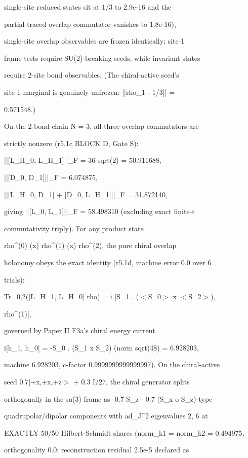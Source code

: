 \documentclass[11pt,a4paper]{article}
\theoremstyle{definition}
\begin{document}
    single-site reduced states sit at 1/3 to 2.9e-16 and the

    partial-traced overlap commutator vanishes to 1.8e-16),

    single-site overlap observables are frozen identically; site-1

    frame tests require SU(2)-breaking seeds, while invariant states

    require 2-site bond observables. (The chiral-active seed's

    site-1 marginal is genuinely unfrozen: ||rho\_1 - 1/3|| =

    0.571548.)


On the 2-bond chain N = 3, all three overlap commutators are

strictly nonzero (r5.1c BLOCK D, Gate S):


    ||[L\_{H\_0}, L\_{H\_1}]||\_F = 36 sqrt(2) = 50.911688,

    ||[D\_0, D\_1]||\_F          = 6.074875,

    ||[L\_{H\_0}, D\_1] + [D\_0, L\_{H\_1}]||\_F = 31.872140,


giving ||[L\_0, L\_1]||\_F = 58.498310 (excluding exact finite-t

commutativity triply). For any product state

rho\^{}{(0)} (x) rho\^{}{(1)} (x) rho\^{}{(2)}, the pure chiral overlap

holonomy obeys the exact identity (r5.1d, machine error 0.0 over 6

trials):


    Tr\_{0,2}([L\_{H\_1}, L\_{H\_0}] rho) = i [S\_1 . ($<$S\_0$>$ x $<$S\_2$>$),

    rho\^{}{(1)}],


governed by Paper II F3a's chiral energy current

i[h\_1, h\_0] = -S\_0 . (S\_1 x S\_2) (norm sqrt(48) = 6.928203,

machine 6.928203, c-factor 0.9999999999999997). On the chiral-active

seed 0.7|+x,+x,+z$>$ + 0.3 I/27, the chiral generator splits

orthogonally in the su(3) frame as -0.7 S\_z - 0.7 (S\_x o S\_z)-type

quadrupolar/dipolar components with ad\_{J\^{}2} eigenvalues {2, 6} at

EXACTLY 50/50 Hilbert-Schmidt shares (norm\_k1 = norm\_k2 = 0.494975,

orthogonality 0.0; reconstruction residual 2.5e-5 declared as
\end{document}
